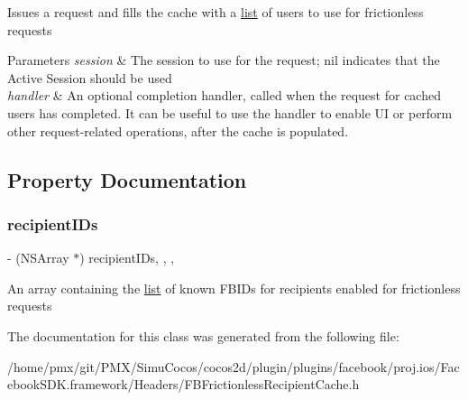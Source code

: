Issues a request and fills the cache with a \hyperlink{protocollist-p}{list} of users to use for frictionless requests


\begin{DoxyParams}{Parameters}
{\em session} & The session to use for the request; nil indicates that the Active Session should be used\\
\hline
{\em handler} & An optional completion handler, called when the request for cached users has completed. It can be useful to use the handler to enable UI or perform other request-\/related operations, after the cache is populated. \\
\hline
\end{DoxyParams}


\subsection{Property Documentation}
\mbox{\label{interfaceFBFrictionlessRecipientCache_af68284081206dbe61081404081bbda4b}} 
\subsubsection{\texorpdfstring{recipient\+I\+Ds}{recipientIDs}}
{\footnotesize\ttfamily -\/ (N\+S\+Array $\ast$) recipient\+I\+Ds\hspace{0.3cm}{\ttfamily [read]}, {\ttfamily [write]}, {\ttfamily [nonatomic]}, {\ttfamily [copy]}}

An array containing the \hyperlink{protocollist-p}{list} of known F\+B\+I\+Ds for recipients enabled for frictionless requests 

The documentation for this class was generated from the following file\+:\begin{DoxyCompactItemize}
\item 
/home/pmx/git/\+P\+M\+X/\+Simu\+Cocos/cocos2d/plugin/plugins/facebook/proj.\+ios/\+Facebook\+S\+D\+K.\+framework/\+Headers/F\+B\+Frictionless\+Recipient\+Cache.\+h\end{DoxyCompactItemize}
